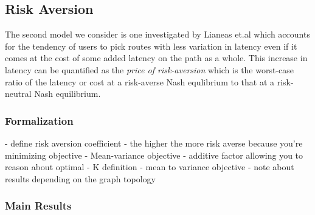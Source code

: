 \subsection{Risk Aversion}
The second model we consider is one investigated by Lianeas et.al \cite{risk-averse} which accounts for the
tendency of users to pick routes with less variation in latency even if it comes at the cost of some added
latency on the path as a whole. This increase in latency can be quantified as the {\em{price of risk-aversion}}
which is the worst-case ratio of the latency or cost at a risk-averse Nash equlibrium to that at a risk-neutral
Nash equilibrium. 


\subsubsection{Formalization}
- define risk aversion coefficient - the higher the more risk averse because you're minimizing objective
- Mean-variance objective - additive factor allowing you to reason about optimal
- K definition - mean to variance objective
- note about results depending on the graph topology


\subsubsection{Main Results}
